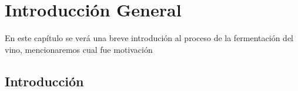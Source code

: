 
\chapter{Introducción General} %

\label{Chapter1} %
\label{IntroGeneral}

En este capítulo se verá una breve introdución al proceso de la fermentación del vino, mencionaremos cual fue motivación 


\newcommand{\keyword}[1]{\textbf{#1}}
\newcommand{\tabhead}[1]{\textbf{#1}}
\newcommand{\code}[1]{\texttt{#1}}
\newcommand{\file}[1]{\texttt{\bfseries#1}}
\newcommand{\option}[1]{\texttt{\itshape#1}}
\newcommand{\grados}{$^{\circ}$}


\section{Introducción}


